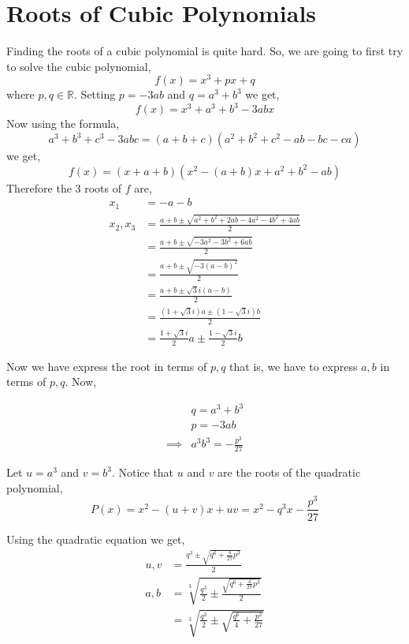 \section{Roots of Cubic Polynomials}
Finding the roots of a cubic polynomial is quite hard. So, we are going to first try to solve the cubic polynomial,
\[
    f(x) = x^{3} + px + q
\]
where $p, q \in \mathbb{R}$.
Setting $p=-3ab$ and $q = a^{3} + b^{3}$ we get,
\[
    f(x) = x^{3} + a^{3} + b^{3} - 3abx
\]
Now using the formula,
\[
    a^{3} + b^{3} + c^{3} - 3abc = (a+b+c)(a^{2} + b^{2} + c^{2} - ab - bc - ca)
\]
we get,
\[
    f(x) = (x+a+b)(x^{2} -(a+b)x + a^{2} + b^{2} - ab)
\]
Therefore the 3 roots of $f$ are,
\begin{align*}
    x_{1}        &= -a-b \\
    x_{2}, x_{3} &= \frac{a+b \pm \sqrt{a^{2} + b^{2} + 2ab - 4a^{2} - 4b^{2} + 4ab}}{2}\\
                 &= \frac{a+b \pm \sqrt{-3a^{2} -3b^{2} + 6ab}}{2} \\
                 &= \frac{a+b \pm \sqrt{-3(a-b)^{2}}}{2} \\
                 &= \frac{a+b \pm \sqrt{3}i(a-b)}{2} \\
                 &= \frac{(1 + \sqrt{3}i)a \pm (1 - \sqrt{3}i)b}{2} \\
                 &= \frac{1+\sqrt{3}i}{2}a \pm \frac{1-\sqrt{3}i}{2}b
\end{align*}

Now we have express the root in terms of $p, q$ that is, we have to express $a,b$ in terms of $p,q$. Now,

\begin{align*}
         & q = a^{3} + b^{3} \\
         & p = -3ab \\
\implies & a^{3}b^{3} = -\frac{p^{3}}{27}
\end{align*}

Let $u=a^{3}$ and $v=b^{3}$. Notice that $u$ and $v$ are the roots of the quadratic polynomial,
\[
    P(x) = x^{2} - (u+v)x + uv = x^{2} - q^{3}x -\frac{p^{3}}{27} 
\]

Using the quadratic equation we get,
\begin{align*}
    u,v &= \frac{q^{3} \pm \sqrt{q^{6} + \frac{4}{27}p^{3}}}{2} \\
    a,b &= \sqrt[3]{\frac{q^{3}}{2} \pm \frac{\sqrt{q^{6} + \frac{4}{27}p^{3}}}{2}}\\
        &= \sqrt[3]{\frac{q^{3}}{2} \pm \sqrt{\frac{q^{6}}{4} + \frac{p^{3}}{27}}}
\end{align*}


